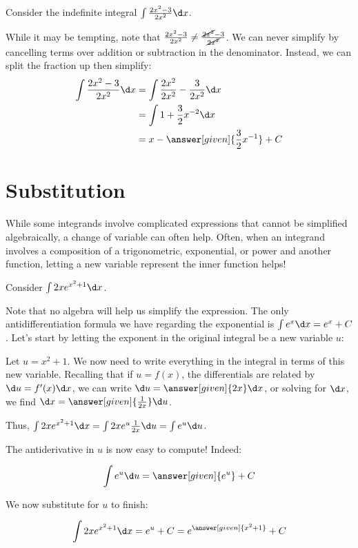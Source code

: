 \documentclass[nooutcomes]{ximera}
\begin{document}
\begin{example}
Consider the indefinite integral $\int \frac{2x^2-3}{2x^2} \d x$.  

While it may be tempting, note that $\frac{2x^2-3}{2x^2} \neq \frac{\cancel{2x^2}-3}{\cancel{2x^2}}$.  We can never simplify by cancelling terms over addition or subtraction in the denominator.  Instead, we can split the fraction up then simplify: 
\begin{align*}
\int \frac{2x^2-3}{2x^2} \d x &=\int \frac{2x^2}{2x^2}-\frac{3}{2x^2} \d x \\
&=  \int 1+\frac{3}{2}x^{-2} \d x \\
&= x- \answer[given]{\frac{3}{2}x^{-1}}+C
\end{align*}

\end{example}

  
\section{Substitution}

While some integrands involve complicated expressions that cannot be simplified algebraically, a change of variable can often help. Often, when an integrand involves a composition of a trigonometric, exponential, or power and another function, letting a new variable represent the inner function helps!

\begin{example}
Consider $\int 2x e^{x^2+1} \d x$.  

Note that no algebra will help us simplify the expression.  The only antidifferentiation formula we have regarding the exponential is $\int e^x \d x = e^x +C$.  Let's start by letting the exponent in the original integral be a new variable $u$:

Let $u= x^2+1$.  We now need to write everything in the integral in terms of this new variable.  Recalling that if $u = f(x)$, the differentials are related by $\d u = f'(x) \d x$, we can write $\d u = \answer[given]{2x} \d x$, or solving for $\d x$, we find $\d x = \answer[given]{\frac{1}{2x}} \d u$.

Thus, $\int 2x e^{x^2+1} \d x = \int 2x e^{u} \frac{1}{2x} \d u = \int e^u \d u$.

The antiderivative in $u$ is now easy to compute!  Indeed:

\[ \int e^u \d u = \answer[given]{e^u}+C \]

We now substitute for $u$ to finish:

\[\int 2xe^{x^2+1} \d x = e^u+C = e^{\answer[given]{x^2+1}}+C \]

\end{example}
\end{document}

